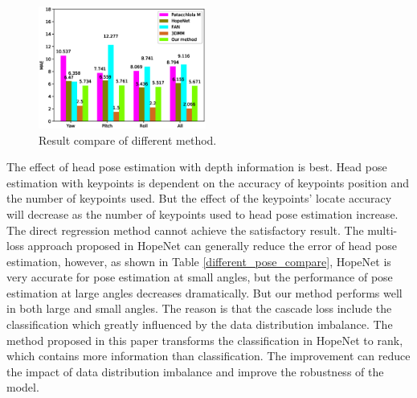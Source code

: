 \documentclass[english]{DDCLSconf}
\begin{document}
\begin{figure}[!tbp]
	\centering
	
	\includegraphics[width=0.49\textwidth]{fig9.eps}
	\caption{Result compare of different method.}
	
	\label{result_compare}       %
	
\end{figure}

The effect of head pose estimation with depth information is best. Head pose estimation with keypoints is dependent on the accuracy of keypoints position and the number of keypoints used. But the effect of the keypoints' locate accuracy will decrease as the number of keypoints used to head pose estimation increase. The direct regression method cannot achieve the satisfactory result. The multi-loss approach proposed in HopeNet can generally reduce the error of head pose estimation, however, as shown in Table \ref{different_pose_compare}, HopeNet is very accurate for pose estimation at small angles, but the performance of pose estimation at large angles decreases dramatically. But our method performs well in both large and small angles. The reason is that the cascade loss include the classification which greatly influenced by the data distribution imbalance. The method proposed in this paper transforms the classification in HopeNet to rank, which contains more information than classification. The improvement can reduce the impact of data distribution imbalance and improve the robustness of the model.
\end{document}
